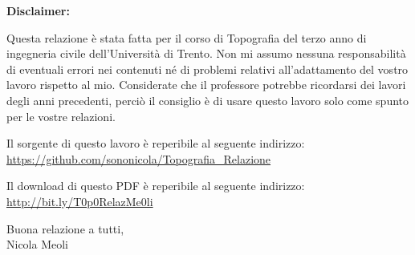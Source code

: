 \pagestyle{plain}

\thispagestyle{empty}

\vspace{2cm}

\doclicenseThis %
\vspace{3cm}
\textbf{{\huge Disclaimer:}}\\
\begin{large}
Questa relazione è stata fatta per il corso di Topografia del terzo anno di ingegneria civile dell'Università di Trento.
Non mi assumo nessuna responsabilità di eventuali errori nei contenuti né di problemi relativi all'adattamento del vostro lavoro rispetto al mio. 
Considerate che il professore potrebbe ricordarsi dei lavori degli anni precedenti, perciò il consiglio è di usare questo lavoro solo come spunto per le vostre relazioni.

\vspace{3cm}
Il sorgente di questo lavoro è reperibile al seguente indirizzo: \\
\url{https://github.com/sononicola/Topografia_Relazione}

\vspace{3cm}
Il download di questo PDF è reperibile al seguente indirizzo:\\
\url{http://bit.ly/T0p0RelazMe0li}
\vspace{3cm}
\begin{flushright}
Buona relazione a tutti,\\
Nicola Meoli 
\end{flushright}
\end{large}
\newpage